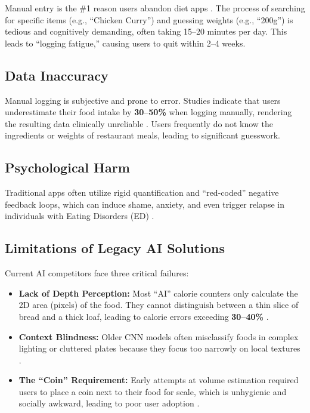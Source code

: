 \documentclass[fleqn,10pt]{SelfArx} %
\begin{document}
Manual entry is the \#1 reason users abandon diet apps \cite{nutriscan2025}. The process of searching for specific items (e.g., ``Chicken Curry'') and guessing weights (e.g., ``200g'') is tedious and cognitively demanding, often taking 15--20 minutes per day. This leads to ``logging fatigue,'' causing users to quit within 2--4 weeks.

\subsection{Data Inaccuracy}

Manual logging is subjective and prone to error. Studies indicate that users underestimate their food intake by \textbf{30--50\%} when logging manually, rendering the resulting data clinically unreliable \cite{nutritioncoaching2025}. Users frequently do not know the ingredients or weights of restaurant meals, leading to significant guesswork.

\subsection{Psychological Harm}

Traditional apps often utilize rigid quantification and ``red-coded'' negative feedback loops, which can induce shame, anxiety, and even trigger relapse in individuals with Eating Disorders (ED) \cite{personalizednutrition2024}.

\subsection{Limitations of Legacy AI Solutions}

Current AI competitors face three critical failures:

\begin{itemize}[noitemsep]
    \item \textbf{Lack of Depth Perception:} Most ``AI'' calorie counters only calculate the 2D area (pixels) of the food. They cannot distinguish between a thin slice of bread and a thick loaf, leading to calorie errors exceeding \textbf{30--40\%} \cite{lifehacker2024}.
    \item \textbf{Context Blindness:} Older CNN models often misclassify foods in complex lighting or cluttered plates because they focus too narrowly on local textures \cite{sciencedaily2024}.
    \item \textbf{The ``Coin'' Requirement:} Early attempts at volume estimation required users to place a coin next to their food for scale, which is unhygienic and socially awkward, leading to poor user adoption \cite{modelbased2013}.
\end{itemize}
\end{document}
